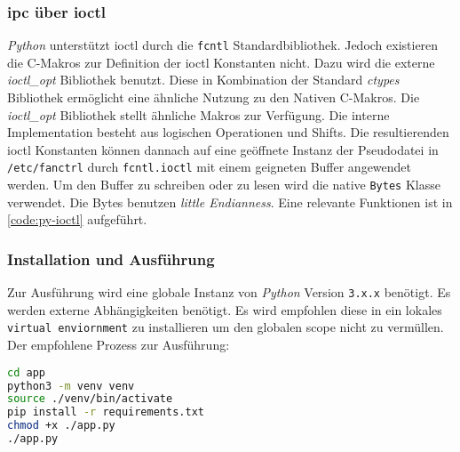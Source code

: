 \subsubsection{\acrshort{ipc} über \acrshort{ioctl}}

\textit{Python} unterstützt \gls{ioctl} durch die \texttt{fcntl} Standardbibliothek.
Jedoch existieren die C-Makros zur Definition der \gls{ioctl} Konstanten nicht.
Dazu wird die externe \textit{ioctl\_opt}\cite{ioctl} Bibliothek benutzt.
Diese in Kombination der Standard \textit{ctypes} Bibliothek ermöglicht eine ähnliche Nutzung zu den Nativen C-Makros.
Die \textit{ioctl\_opt} Bibliothek stellt ähnliche Makros zur Verfügung.
Die interne Implementation besteht aus logischen Operationen und Shifts.
Die resultierenden \gls{ioctl} Konstanten können dannach auf eine geöffnete Instanz der Pseudodatei in \texttt{/etc/fanctrl} durch \texttt{fcntl.ioctl} mit einem geigneten Buffer angewendet werden.
Um den Buffer zu schreiben oder zu lesen wird die native \texttt{Bytes} Klasse verwendet.
Die Bytes benutzen \textit{little Endianness}.
Eine relevante Funktionen ist in \autoref{code:py-ioctl} aufgeführt.



\subsubsection{Installation und Ausführung}

Zur Ausführung wird eine globale Instanz von \textit{Python} Version \texttt{3.x.x} benötigt.
Es werden externe Abhängigkeiten benötigt.
Es wird empfohlen diese in ein lokales \texttt{virtual enviornment} zu installieren um den globalen scope nicht zu vermüllen.
Der empfohlene Prozess zur Ausführung:
\begin{lstlisting}[language=bash, numbers=none]
cd app
python3 -m venv venv
source ./venv/bin/activate
pip install -r requirements.txt
chmod +x ./app.py
./app.py
\end{lstlisting}
